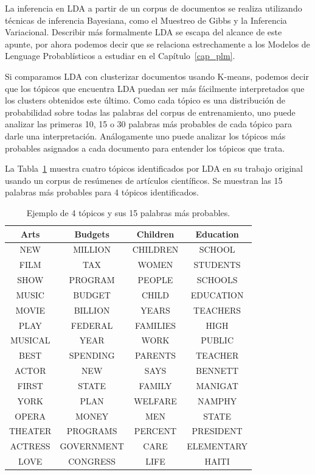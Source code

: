 La inferencia en LDA a partir de un corpus de documentos se realiza utilizando técnicas de inferencia Bayesiana, como el Muestreo de Gibbs y la Inferencia Variacional. Describir más formalmente LDA se escapa del alcance de este apunte, por ahora podemos decir que se relaciona estrechamente a los Modelos de Lenguage Probablísticos a estudiar en el Capítulo~\ref{cap_plm}.

Si comparamos LDA con clusterizar documentos usando K-means, podemos decir que los tópicos que encuentra LDA puedan ser más fácilmente interpretados que los clusters obtenidos este último. Como cada tópico es una distribución de probabilidad sobre todas las palabras del corpus de entrenamiento, uno puede analizar las primeras 10, 15 o 30 palabras más probables de cada tópico para darle una interpretación. Análogamente uno puede analizar los tópicos más probables asignados a cada documento para entender los tópicos que trata. 

La Tabla~\ref{tab:lda} muestra cuatro tópicos identificados por LDA en su trabajo original \cite{blei2003latent} usando un corpus de resúmenes de artículos científicos. Se muestran las 15 palabras más probables para 4 tópicos identificados.

\begin{table}[h]
\centering
\begin{tabular}{|c|c|c|c|}
\hline
Arts & Budgets & Children & Education \\
\hline
NEW & MILLION & CHILDREN & SCHOOL \\
FILM & TAX & WOMEN & STUDENTS \\
SHOW & PROGRAM & PEOPLE & SCHOOLS \\
MUSIC & BUDGET & CHILD & EDUCATION \\
MOVIE & BILLION & YEARS & TEACHERS \\
PLAY & FEDERAL & FAMILIES & HIGH \\
MUSICAL & YEAR & WORK & PUBLIC \\
BEST & SPENDING & PARENTS & TEACHER \\
ACTOR & NEW & SAYS & BENNETT \\
FIRST & STATE & FAMILY & MANIGAT \\
YORK & PLAN & WELFARE & NAMPHY \\
OPERA & MONEY & MEN & STATE \\
THEATER & PROGRAMS & PERCENT & PRESIDENT \\
ACTRESS & GOVERNMENT & CARE & ELEMENTARY \\
LOVE & CONGRESS & LIFE & HAITI \\
\hline
\end{tabular}
\caption{Ejemplo de 4 tópicos y sus 15 palabras más probables.}
\label{tab:lda}
\end{table}


